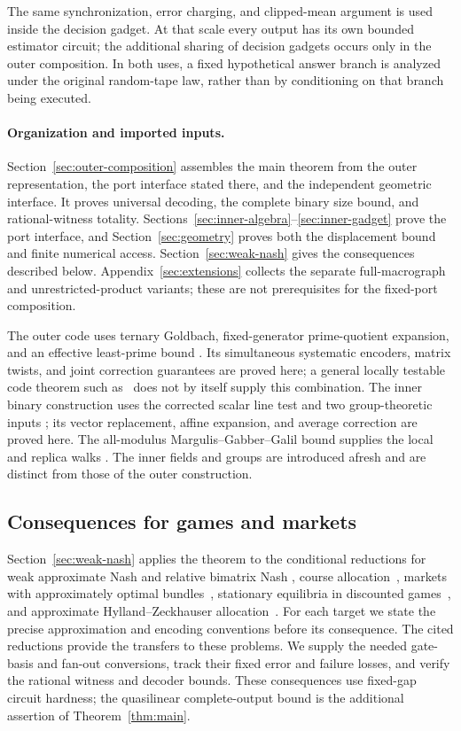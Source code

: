 The same synchronization, error charging, and clipped-mean argument is
used inside the decision gadget. At that scale every output has its own
bounded estimator circuit; the additional sharing of decision gadgets
occurs only in the outer composition. In both uses, a fixed hypothetical
answer branch is analyzed under the original random-tape law, rather
than by conditioning on that branch being executed.

\paragraph{Organization and imported inputs.}
Section~\ref{sec:outer-composition} assembles the main theorem from
the outer representation, the port interface stated there, and the
independent geometric interface. It proves universal decoding, the
complete binary size bound, and rational-witness totality.
Sections~\ref{sec:inner-algebra}--\ref{sec:inner-gadget} prove the port
interface, and Section~\ref{sec:geometry} proves both the displacement
bound and finite numerical access. Section~\ref{sec:weak-nash} gives
the consequences described below. Appendix~\ref{sec:extensions}
collects the separate full-macrograph and unrestricted-product variants;
these are not prerequisites for the fixed-port composition.

The outer code uses ternary Goldbach, fixed-generator prime-quotient
expansion, and an effective least-prime bound
\cite{Helfgott2013,BG2008,Xylouris2011}. Its simultaneous systematic
encoders, matrix twists, and joint correction guarantees are proved
here; a general locally testable code theorem such as~\cite{DEL+2022}
does not by itself supply this combination. The inner binary construction
uses the corrected scalar line test and two group-theoretic inputs
\cite{FS1995,EJZ2010,Shalom1999}; its vector replacement, affine
expansion, and average correction are proved here. The all-modulus
Margulis--Gabber--Galil bound supplies the local and replica walks
\cite{MGGAFP}. The inner fields and groups are introduced afresh and
are distinct from those of the outer construction.

\subsection{Consequences for games and markets}

Section~\ref{sec:weak-nash} applies the theorem to the conditional
reductions for weak approximate Nash and relative bimatrix Nash
\cite{BPR2016}, course allocation~\cite{BPR2016}, markets with
approximately optimal bundles~\cite{Fisher2026}, stationary equilibria
in discounted games~\cite{DGZ2023,PZO2025,FKPP2026}, and approximate
Hylland--Zeckhauser allocation~\cite{HZ2026}. For each target we state
the precise approximation and encoding conventions before its
consequence. The cited reductions provide the transfers to these
problems. We supply the needed gate-basis and fan-out conversions, track
their fixed error and failure losses, and verify the rational witness
and decoder bounds. These consequences use fixed-gap circuit hardness;
the quasilinear complete-output bound is the additional assertion of
Theorem~\ref{thm:main}.
